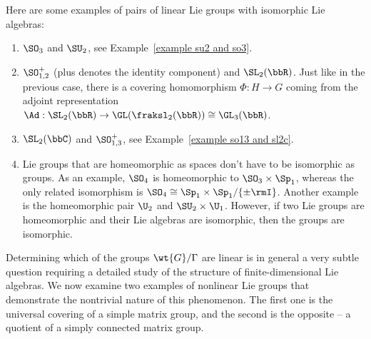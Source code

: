 \begin{example}
    Here are some examples of pairs of linear Lie groups with isomorphic Lie algebras:
    \begin{enumerate}
        \item $\SO_3$ and $\SU_2$, see Example~\ref{example su2 and so3}.
        \item $\SO^+_{1,2}$ (plus denotes the identity component) and $\SL_2(\bbR)$. Just like in the previous case, there is a covering homomorphism $\Phi:H\to G$ coming from the adjoint representation $\Ad:\SL_2(\bbR)\to \GL(\fraksl_2(\bbR))\cong \GL_3(\bbR)$.
        \item $\SL_2(\bbC)$ and $\SO_{1,3}^+$, see Example~\ref{example so13 and sl2c}.
        \item Lie groups that are homeomorphic as spaces don't have to be isomorphic as groups. As an example, $\SO_4$ is homeomorphic to $\SO_3\times \Sp_1$, whereas the only related isomorphism is $\SO_4\cong \Sp_1\times\Sp_1\slash \{\pm \rmI\}$. Another example is the homeomorphic pair $\U_2$ and $\SU_2\times \U_1$. However, if two Lie groups are homeomorphic and their Lie algebras are isomorphic, then the groups are isomorphic.
    \end{enumerate}
\end{example}


Determining which of the groups $\wt{G}\slash \Gamma$ are linear is in general a very subtle question requiring a detailed study of the structure of finite-dimensional Lie algebras. We now examine two examples of nonlinear Lie groups that demonstrate the nontrivial nature of this phenomenon. The first one is the universal covering of a simple matrix group, and the second is the opposite -- a quotient of a simply connected matrix group.

